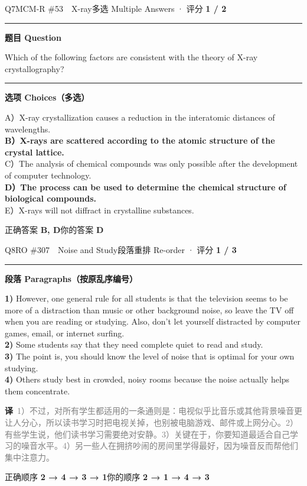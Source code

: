\documentclass[11pt]{article}
\newcommand{\ptesub}[1]{%
  \par\needspace{2\baselineskip}\smallskip
  {\color{cAccent}\rule[-0.2ex]{3pt}{1.05em}}\hspace{6pt}%
  {\bfseries\color{cHead}#1}\par\nopagebreak\smallskip}
\newcommand{\zh}[1]{{\footnotesize\textcolor{cNote}{\textbf{译}}\ \textcolor{gray}{#1}}}
\begin{document}
\begin{qblock}{Q7\quad MCM-R \#53\ \ X-ray}{多选 Multiple Answers · 评分 \textcolor{cAccent}{\bfseries 1 / 2}}
\ptesub{题目 Question}
\begin{notebox}\small Which of the following factors are consistent with the theory of X-ray crystallography?\end{notebox}
\ptesub{选项 Choices（多选）}
{\small
A）X-ray crystallization causes a reduction in the interatomic distances of wavelengths.\\
{\color{cFix}\textbf{B）X-rays are scattered according to the atomic structure of the crystal lattice.}}\\
C）The analysis of chemical compounds was only possible after the development of computer technology.\\
{\color{cFix}\textbf{D）The process can be used to determine the chemical structure of biological compounds.}}\\
E）X-rays will not diffract in crystalline substances.}
\smallskip\par
{\small 正确答案 \textcolor{cFix}{\bfseries B, D}\qquad 你的答案 {\color{cWrong}\bfseries D}}
\end{qblock}

\begin{qblock}{Q8\quad RO \#307\ \ Noise and Study}{段落重排 Re-order · 评分 \textcolor{cAccent}{\bfseries 1 / 3}}
\ptesub{段落 Paragraphs（按原乱序编号）}
\begin{promptbox}\small
\textbf{1)} However, one general rule for all students is that the television seems to be more of a distraction than music or other background noise, so leave the TV off when you are reading or studying. Also, don't let yourself distracted by computer games, email, or internet surfing.\\[2pt]
\textbf{2)} Some students say that they need complete quiet to read and study.\\[2pt]
\textbf{3)} The point is, you should know the level of noise that is optimal for your own studying.\\[2pt]
\textbf{4)} Others study best in crowded, noisy rooms because the noise actually helps them concentrate.
\end{promptbox}
\zh{1）不过，对所有学生都适用的一条通则是：电视似乎比音乐或其他背景噪音更让人分心，所以读书学习时把电视关掉，也别被电脑游戏、邮件或上网分心。2）有些学生说，他们读书学习需要绝对安静。3）关键在于，你要知道最适合自己学习的噪音水平。4）另一些人在拥挤吵闹的房间里学得最好，因为噪音反而帮他们集中注意力。}
\smallskip\par
{\small 正确顺序 \textcolor{cFix}{\bfseries 2 → 4 → 3 → 1}\qquad 你的顺序 {\color{cWrong}\bfseries 2 → 1 → 4 → 3}}
\end{qblock}
\end{document}
